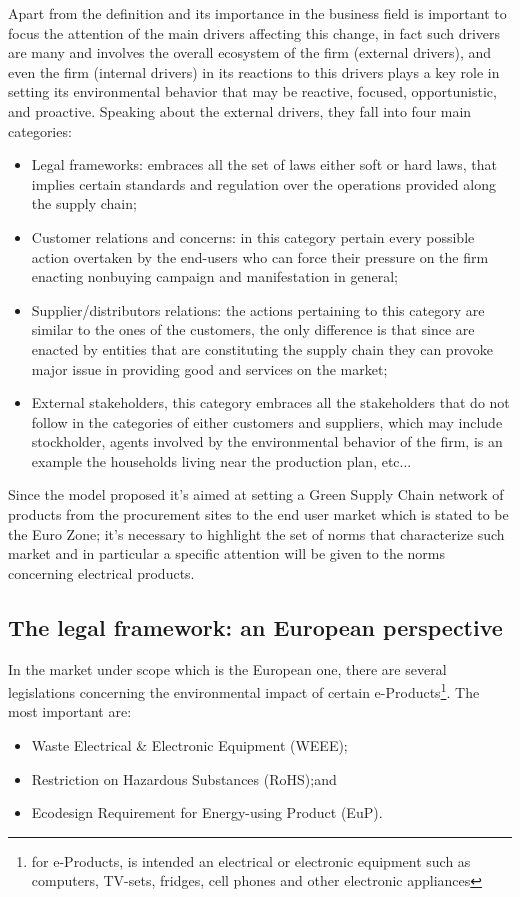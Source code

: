 \begin{doublespace}
  Apart from the definition and its importance in the business field is important to focus the attention of the main drivers affecting this change, in fact such drivers are many and involves the overall ecosystem of the firm (external drivers), and even the firm (internal drivers) in its reactions to this drivers plays a key role in setting its environmental behavior that may be reactive, focused, opportunistic, and proactive\cite{YolLee2007}. Speaking about the external drivers, they fall into four main categories:
  \begin{itemize}
	  \item Legal frameworks: embraces all the set of laws either soft or hard laws, that implies certain standards and regulation over the operations provided along the supply chain;
	  \item Customer relations and concerns: in this category pertain every possible action overtaken by the end-users who can force their pressure on the firm enacting nonbuying campaign and manifestation in general;
	  \item Supplier/distributors relations: the actions pertaining to this category are similar to the ones of the customers, the only difference is that since are enacted    by entities that are constituting the supply chain they can provoke major issue in providing good and services on the market;
	  \item External stakeholders, this category embraces all the stakeholders that do not follow in the categories of either customers and suppliers, which may include stockholder, agents involved by the environmental behavior of the firm, is an example the households living near the production plan, etc...
  \end{itemize}
Since the model proposed it's aimed at setting a Green Supply Chain network of products from the procurement sites to the end user market which is stated to be the Euro Zone; it's necessary to highlight the set of norms that characterize such market and in particular a specific attention will be given to the norms concerning electrical products.

  \subsection{The legal framework: an European perspective}
  In the market under scope which is the European one, there are several legislations concerning the environmental impact of certain e-Products\footnote{for e-Products, is intended an electrical or electronic equipment such as computers, TV-sets, fridges, cell phones and other electronic appliances}. The most important are:
  \begin{itemize}
    \item Waste Electrical \& Electronic Equipment (WEEE);
    \item Restriction on Hazardous Substances (RoHS);and
    \item Ecodesign Requirement for Energy-using Product (EuP).
  \end{itemize}


\end{doublespace}
